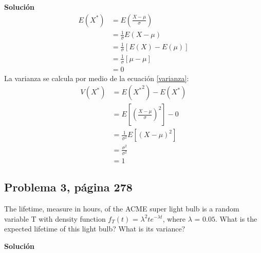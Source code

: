 \documentclass{article}
\begin{document}
\noindent \textbf{Solución}
\begin{align}
\nonumber
E{(X^*)}    & =  E\left(\frac{X - \mu}{\sigma}\right)\\ \nonumber
            & =  \frac{1}{\sigma}E(X - \mu) \\ \nonumber
            & =  \frac{1}{\sigma}[E(X) - E(\mu)] \\ \nonumber
            & =  \frac{1}{\sigma}[\mu - \mu] \\ \nonumber
            & = 0
\end{align}
La varianza se calcula por medio de la ecuación \ref{varianza}:
\begin{align}
\nonumber
V{(X^*)}    & =  E{({X^*}^2)} - E{(X^*)}\\ \nonumber
            & =  E\left[\left(\frac{X - \mu}{\sigma}\right)^2 \right] - 0\\ \nonumber
            & =  \frac{1}{\sigma^2}E[(X - \mu)^2] \\ \nonumber
            & =  \frac{\sigma^2}{\sigma^2} \\ \nonumber
            & = 1
\end{align}

\subsection{Problema 3, página 278}
The lifetime, measure in hours, of the ACME super light bulb is a random variable T with density function $f_{T}(t)$ = $\lambda^2 te^{- \lambda t}$, where $\lambda$ = $0.05$. What is the expected lifetime of this light bulb? What is its variance?

\noindent \textbf{Solución}
\end{document}
